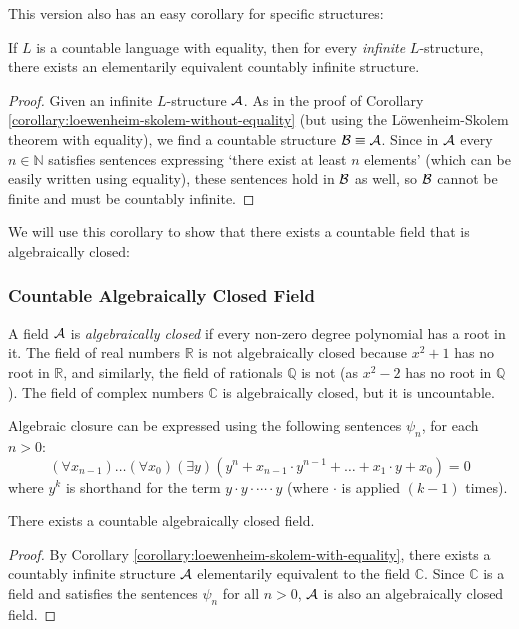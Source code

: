 This version also has an easy corollary for specific structures:

\begin{corollary}\label{corollary:loewenheim-skolem-with-equality}
    If $L$ is a countable language with equality, then for every \emph{infinite} $L$-structure, there exists an elementarily equivalent countably infinite structure.
\end{corollary}
\begin{proof}
    Given an infinite $L$-structure $\mathcal{A}$. As in the proof of Corollary \ref{corollary:loewenheim-skolem-without-equality} (but using the Löwenheim-Skolem theorem with equality), we find a countable structure $\mathcal{B}\equiv\mathcal{A}$. Since in $\mathcal{A}$ every $n\in\mathbb{N}$ satisfies sentences expressing `there exist at least $n$ elements' (which can be easily written using equality), these sentences hold in $\mathcal{B}$ as well, so $\mathcal{B}$ cannot be finite and must be countably infinite.
\end{proof}

We will use this corollary to show that there exists a countable field that is algebraically closed:

\subsubsection*{Countable Algebraically Closed Field}

A field $\mathcal{A}$ is \emph{algebraically closed} if every non-zero degree polynomial has a root in it. The field of real numbers $\mathbb{R}$ is not algebraically closed because $x^2+1$ has no root in $\mathbb{R}$, and similarly, the field of rationals $\mathbb{Q}$ is not (as $x^2-2$ has no root in $\mathbb{Q}$). The field of complex numbers $\mathbb{C}$ is algebraically closed, but it is uncountable.

Algebraic closure can be expressed using the following sentences $\psi_n$, for each $n>0$:
$$
(\forall x_{n-1})\dots(\forall x_0)(\exists y)(y^n+x_{n-1}\cdot y^{n-1}+\dots+x_1\cdot y + x_0) = 0
$$
where $y^k$ is shorthand for the term $y \cdot y \cdot \cdots \cdot y$ (where $\cdot$ is applied $(k-1)$ times).

\begin{corollary}
    There exists a countable algebraically closed field.
\end{corollary}
\begin{proof}
    By Corollary \ref{corollary:loewenheim-skolem-with-equality}, there exists a countably infinite structure $\mathcal{A}$ elementarily equivalent to the field $\mathbb{C}$. Since $\mathbb{C}$ is a field and satisfies the sentences $\psi_n$ for all $n>0$, $\mathcal{A}$ is also an algebraically closed field.
\end{proof}

